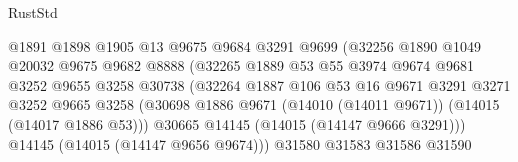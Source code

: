 \begin{lexlean}{RustStd}
\begin{coremodule}
                                        @1891
                                        @1898
                                        @1905
                                        @13
                                        @9675
                                        @9684
                                        @3291
                                        @9699
                                        (@32256
                                          @1890
                                          @1049
                                          @20032
                                          @9675
                                          @9682
                                          @8888
                                          (@32265
                                            @1889
                                            @53
                                            @55
                                            @3974
                                            @9674
                                            @9681
                                            @3252
                                            @9655
                                            @3258
                                            @30738
                                            (@32264
                                              @1887
                                              @106
                                              @53
                                              @16
                                              @9671
                                              @3291
                                              @3271
                                              @3252
                                              @9665
                                              @3258
                                              (@30698
                                                @1886
                                                @9671
                                                (@14010 (@14011 @9671))
                                                (@14015 (@14017 @1886 @53)))
                                              @30665
                                              @14145
                                              (@14015 (@14147 @9666 @3291)))
                                            @14145
                                            (@14015 (@14147 @9656 @9674)))
                                          @31580
                                          @31583
                                          @31586
                                          @31590

\end{coremodule}
\end{lexlean}
